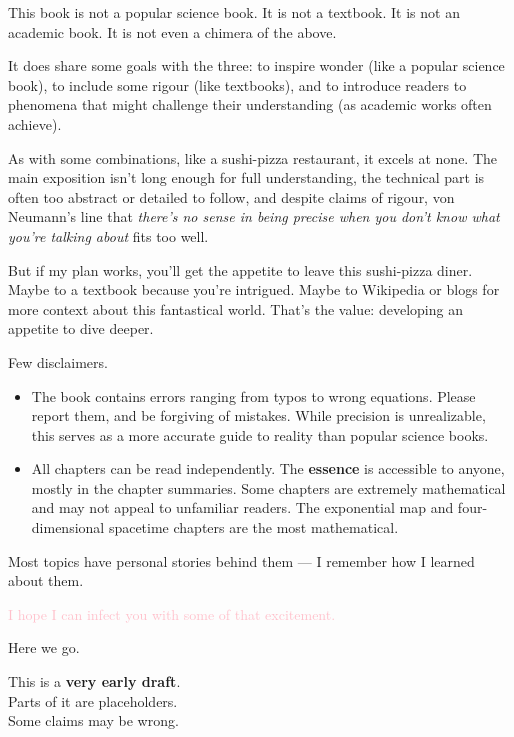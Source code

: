 \begin{tcolorbox}[
    colback=white,
    colframe=gray!40,
    boxrule=0.5pt,
    arc=1mm,
    left=10pt,
    right=10pt,
    top=10pt,
    bottom=10pt,
    width=\textwidth,
    enlarge left by=0mm,
    sharp corners=south,
    breakable
]
\setlength{\parskip}{1em}

This book is not a popular science book. It is not a textbook. It is not an academic book. It is not even a chimera of the above.  

It does share some goals with the three: to inspire wonder (like a popular science book), to include some rigour (like textbooks), and to introduce readers to phenomena that might challenge their understanding (as academic works often achieve).

As with some combinations, like a sushi-pizza restaurant, it excels at none.  
The main exposition isn't long enough for full understanding, the technical part is often too abstract or detailed to follow, and despite claims of rigour, von Neumann's line that \textit{there's no sense in being precise when you don't know what you're talking about} fits too well.

But if my plan works, you'll get the appetite to leave this sushi-pizza diner. Maybe to a textbook because you're intrigued. Maybe to Wikipedia or blogs for more context about this fantastical world. That's the value: developing an appetite to dive deeper.

Few disclaimers.

\begin{itemize}
    \item The book contains errors ranging from typos to wrong equations. Please report them, and be forgiving of mistakes. While precision is unrealizable, this serves as a more accurate guide to reality than popular science books.

    \item All chapters can be read independently. The \textbf{essence} is accessible to anyone, mostly in the chapter summaries. Some chapters are extremely mathematical and may not appeal to unfamiliar readers. The exponential map and four-dimensional spacetime chapters are the most mathematical.
\end{itemize}

Most topics have personal stories behind them — I remember how I learned about them. 

\textcolor{pink}{I hope I can infect you with some of that excitement.}

Here we go.
\end{tcolorbox}


\begin{tcolorbox}[
    colback=red!5,
    colframe=red!60!black,
    boxrule=1pt,
    arc=0.5mm,
    left=10pt,
    right=10pt,
    top=10pt,
    bottom=10pt,
    width=\textwidth,
    sharp corners=south,
    breakable,
    title=\textbf{DRAFT WARNING}
]
\setlength{\parskip}{1em}

This is a \textbf{very early draft}.\\
Parts of it are placeholders.\\
Some claims may be wrong.

\end{tcolorbox}
